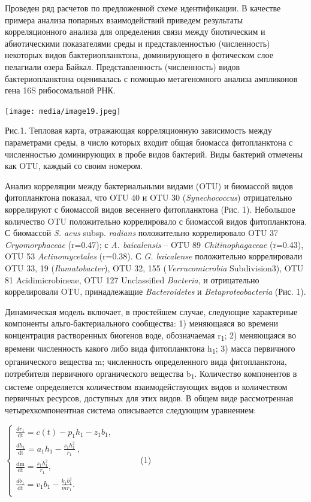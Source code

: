 \documentclass[a4paper,12pt,openany,final]{extreport}
\begin{document}
Проведен ряд расчетов по предложенной схеме идентификации. В качестве
примера анализа попарных взаимодействий приведем результаты
корреляционного анализа для определения связи между биотическим и
абиотическими показателями среды и представленностью (численность)
некоторых видов бактериопланктона, доминирующего в фотическом слое
пелагиали озера Байкал. Представленность (численность) видов
бактериопланктона оценивалась с помощью метагеномного анализа ампликонов
гена 16S рибосомальной РНК.

\texttt{[image: media/image19.jpeg]}

Рис.1. Тепловая карта, отражающая корреляционную зависимость между
параметрами среды, в число которых входит общая биомасса фитопланктона с
численностью доминирующих в пробе видов бактерий. Виды бактерий отмечены
как OTU, каждый со своим номером.

Анализ корреляции между бактериальными видами (OTU) и биомассой видов
фитопланктона показал, что OTU 40 и OTU 30 (\emph{Synechococcus})
отрицательно коррелируют с биомассой видов весеннего фитопланктона (Рис.
1). Небольшое количество OTU положительно коррелировало с биомассой
видов фитопланктона. С биомассой \emph{S. acus} subsp. \emph{radians}
положительно коррелировало OTU 37 \emph{Cryomorphaceae} (r=0.47); с
\emph{A. baicalensis} -- OTU 89 \emph{Chitinophagaceae} (r=0.43), OTU 53
\emph{Actinomycetales} (r=0.38). С \emph{G. baicalense} положительно
коррелировали OTU 33, 19 (\emph{Ilumatobacter}), OTU 32, 155
(\emph{Verrucomicrobia} Subdivision3), OTU 81 Acidimicrobineae, OTU 127
Unclassified \emph{Bacteria}, и отрицательно коррелировали OTU,
принадлежащие \emph{Bacteroidetes} и \emph{Betaproteobacteria} (Рис. 1).

Динамическая модель включает, в простейшем случае, следующие характерные
компоненты альго-бактериального сообщества: 1) меняющаяся во времени
концентрация растворенных биогенов воде, обозначаемая
r\textsubscript{1}; 2) меняющаяся во времени численность какого либо
вида фитопланктона h\textsubscript{1}; 3) масса первичного органического
вещества m; численность определенного вида фитопланктона, потребителя
первичного органического вещества b\textsubscript{1}. Количество
компонентов в системе определяется количеством взаимодействующих видов и
количеством первичных ресурсов, доступных для этих видов. В общем виде
рассмотренная четырехкомпонентная система описывается следующим
уравнением:

\(\left\{ \begin{matrix}
\frac{dr_{1}}{\text{dt}} = c\left( t \right) - p_{1}h_{1} - z_{1}b_{1},\ \ \ \ \ \ \ \ \ \ \  \\
\frac{dh_{1}}{\text{dt}} = a_{1}h_{1} - \frac{s_{1}h_{1}^{2}}{r_{1}}\ ,\ \ \ \ \ \ \ \ \ \ \ \ \ \ \ \ \ \ \ \ \ \ \ \  \\
\frac{\text{dm}}{\text{dt}} = \frac{s_{1}h_{1}^{2}}{r_{1}},\ \ \ \ \ \ \ \ \ \ \ \ \ \ \ \ \ \ \ \ \ \ \ \ \ \ \ \ \ \ \ \ \ \ \ \ \ \ \ \  \\
\frac{db_{1}}{\text{dt}} = v_{1}b_{1} - \frac{k_{1}b_{1}^{2}}{mr_{1}}\text{.\ \ \ \ \ \ \ \ \ \ \ \ \ \ \ \ \ \ \ \ \ \ \ \ \ } \\
\end{matrix} \right.\ \) (1)
\end{document}
